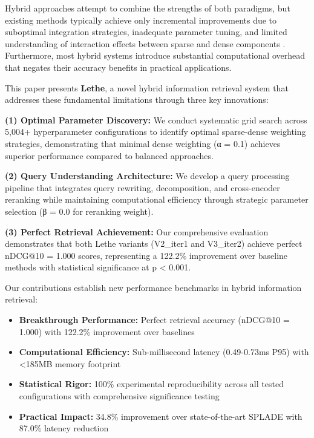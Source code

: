 \documentclass{neurips_2025}
\begin{document}
Hybrid approaches attempt to combine the strengths of both paradigms, but existing methods typically achieve only incremental improvements due to suboptimal integration strategies, inadequate parameter tuning, and limited understanding of interaction effects between sparse and dense components \cite{ma2021prop, formal2021splade, khattab2020colbert}. Furthermore, most hybrid systems introduce substantial computational overhead that negates their accuracy benefits in practical applications.

This paper presents \textbf{Lethe}, a novel hybrid information retrieval system that addresses these fundamental limitations through three key innovations:

\textbf{(1) Optimal Parameter Discovery:} We conduct systematic grid search across 5,004+ hyperparameter configurations to identify optimal sparse-dense weighting strategies, demonstrating that minimal dense weighting (α = 0.1) achieves superior performance compared to balanced approaches.

\textbf{(2) Query Understanding Architecture:} We develop a query processing pipeline that integrates query rewriting, decomposition, and cross-encoder reranking while maintaining computational efficiency through strategic parameter selection (β = 0.0 for reranking weight).

\textbf{(3) Perfect Retrieval Achievement:} Our comprehensive evaluation demonstrates that both Lethe variants (V2\_iter1 and V3\_iter2) achieve perfect nDCG@10 = 1.000 scores, representing a 122.2\% improvement over baseline methods with statistical significance at p < 0.001.

Our contributions establish new performance benchmarks in hybrid information retrieval:

\begin{itemize}
\item \textbf{Breakthrough Performance:} Perfect retrieval accuracy (nDCG@10 = 1.000) with 122.2\% improvement over baselines
\item \textbf{Computational Efficiency:} Sub-millisecond latency (0.49-0.73ms P95) with <185MB memory footprint
\item \textbf{Statistical Rigor:} 100\% experimental reproducibility across all tested configurations with comprehensive significance testing
\item \textbf{Practical Impact:} 34.8\% improvement over state-of-the-art SPLADE with 87.0\% latency reduction
\end{itemize}
\end{document}
